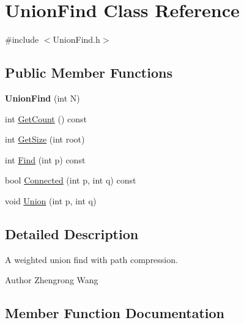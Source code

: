 \hypertarget{classUnionFind}{}\section{Union\+Find Class Reference}
\label{classUnionFind}


{\ttfamily \#include $<$Union\+Find.\+h$>$}

\subsection*{Public Member Functions}
\begin{DoxyCompactItemize}
\item 
\hypertarget{classUnionFind_a686b5bff420abaf11f11e20e692b50e0}{}{\bfseries Union\+Find} (int N)\label{classUnionFind_a686b5bff420abaf11f11e20e692b50e0}

\item 
int \hyperlink{classUnionFind_ab948169c25b587de74e50095120dca88}{Get\+Count} () const 
\item 
int \hyperlink{classUnionFind_a4cd75bd3849d69fbdb186250a3e20ac6}{Get\+Size} (int root)
\item 
int \hyperlink{classUnionFind_a4b831f0ca552a8ba0690c8b6c6012fa6}{Find} (int p) const 
\item 
bool \hyperlink{classUnionFind_a8e5ab36a1cafc1969340cd6102c88c37}{Connected} (int p, int q) const 
\item 
void \hyperlink{classUnionFind_aa999e333a6da859acb9261de757d42f7}{Union} (int p, int q)
\end{DoxyCompactItemize}


\subsection{Detailed Description}
A weighted union find with path compression. \begin{DoxyAuthor}{Author}
Zhengrong Wang 
\end{DoxyAuthor}


\subsection{Member Function Documentation}
\hypertarget{classUnionFind_a8e5ab36a1cafc1969340cd6102c88c37}{}
